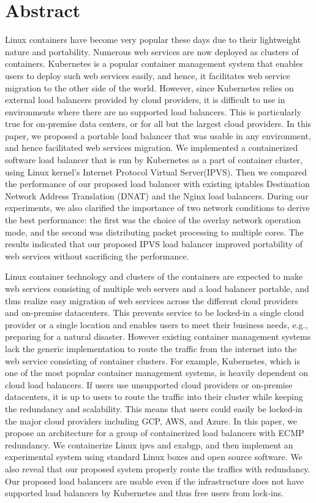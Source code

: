 \chapter*{Abstract}

Linux containers have become very popular these days due to their lightweight nature and portability. 
Numerous web services are now deployed as clusters of containers. 
Kubernetes is a popular container management system that enables users to deploy such web services easily, and hence, 
it facilitates web service migration to the other side of the world.
However, since Kubernetes relies on external load balancers provided by cloud providers, 
it is difficult to use in environments where there are no supported load balancers.
This is particularly true for on-premise data centers, or for all but the largest cloud providers.
In this paper, we proposed a portable load balancer that was usable in any environment, and hence facilitated web services migration.
We implemented a containerized software load balancer that is run by Kubernetes as a part of container cluster, 
using Linux kernel's Internet Protocol Virtual Server(IPVS).
Then we compared the performance of our proposed load balancer with existing iptables Destination Network Address 
Translation (DNAT) and the Nginx load balancers.
During our experiments, we also clarified the importance of two network conditions to derive the best performance: 
the first was the choice of the overlay network operation mode, and the second was distributing packet processing to multiple cores.
The results indicated that our proposed IPVS load balancer improved portability of web services without sacrificing the performance.


Linux container technology and clusters of the containers are expected to make web services consisting of multiple web servers and a load balancer portable, and thus realize easy migration of web services across the different cloud providers and on-premise datacenters.
This prevents service to be locked-in a single cloud provider or a single location and enables users to meet their business needs, e.g., preparing for a natural disaster.
However existing container management systems lack the generic implementation to route the traffic from the internet into the web service consisting of container clusters.
For example, Kubernetes, which is one of the most popular container management systems, is heavily dependent on cloud load balancers. If users use unsupported cloud providers or on-premise datacenters, it is up to users to route the traffic into their cluster while keeping the redundancy and scalability.
This means that users could easily be locked-in the major cloud providers including GCP, AWS, and Azure.
In this paper, we propose an architecture for a group of containerized load balancers with ECMP redundancy.
We containerize Linux ipvs and exabgp, and then implement an experimental system using standard Linux boxes and open source software.
We also reveal that our proposed system properly route the traffics with redundancy.
Our proposed load balancers are usable even if the infrastructure does not have supported load balancers by Kubernetes and thus free users from lock-ins.

